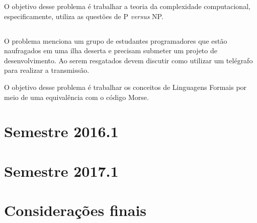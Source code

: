 O objetivo desse problema é trabalhar a teoria da complexidade
computacional, especificamente, utiliza as questões de
P \textit{versus} NP.

\subsection{\ProblemaG}
O problema menciona um grupo de estudantes programadores que
estão naufragados em uma ilha deserta e precisam submeter
um projeto de desenvolvimento. Ao serem resgatados devem
discutir como utilizar um telégrafo para realizar
a transmissão.

O objetivo desse problema é trabalhar os conceitos de
Linguagens Formais por meio de uma equivalência com
o código Morse.

\subsection{\ProblemaH}

\subsection{\ProblemaI}

\section{Semestre 2016.1}
\label{sec-exp-2016}

\section{Semestre 2017.1}
\label{sec-exp-2017}

\section{Considerações finais}
